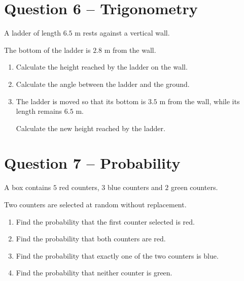 	\newpage
	
	\section*{Question 6 -- Trigonometry }
	
	A ladder of length \(6.5\) m rests against a vertical wall.
	
	The bottom of the ladder is \(2.8\) m from the wall.
	
	\begin{enumerate}
		
		\item[(a)]
		Calculate the height reached by the ladder on the wall.
		
		\vspace{30mm}
		
		\item[(b)]
		Calculate the angle between the ladder and the ground.
		
		\vspace{25mm}
		
		\item[(c)]
		The ladder is moved so that its bottom is \(3.5\) m from the wall, while its length remains \(6.5\) m.
		
		Calculate the new height reached by the ladder.
		
	\end{enumerate}
	
	\newpage
	
	\section*{Question 7 -- Probability }
	
	A box contains \(5\) red counters, \(3\) blue counters and \(2\) green counters.
	
	Two counters are selected at random without replacement.
	
	\begin{enumerate}
		
		\item[(a)]
		Find the probability that the first counter selected is red.
		
		\vspace{15mm}
		
		\item[(b)]
		Find the probability that both counters are red.
		
		\vspace{20mm}
		
		\item[(c)]
		Find the probability that exactly one of the two counters is blue.
		
		\vspace{25mm}
		
		\item[(d)]
		Find the probability that neither counter is green.
		
	\end{enumerate}
	
